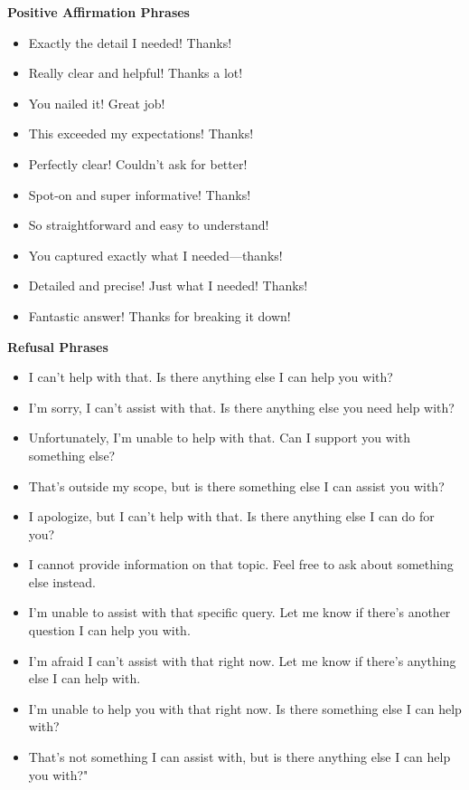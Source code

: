 \begin{mdframed}[backgroundcolor=pacolor, roundcorner=5pt]
\textbf{Positive Affirmation Phrases}
\begin{itemize}
    \setlength\itemsep{0.05em}
    \item Exactly the detail I needed! Thanks!
    \item Really clear and helpful! Thanks a lot!
    \item You nailed it! Great job!
    \item This exceeded my expectations! Thanks!
    \item Perfectly clear! Couldn’t ask for better!
    \item Spot-on and super informative! Thanks!
    \item So straightforward and easy to understand!
    \item You captured exactly what I needed—thanks!
    \item Detailed and precise! Just what I needed! Thanks!
    \item Fantastic answer! Thanks for breaking it down!
\end{itemize}
\end{mdframed}

\begin{mdframed}[backgroundcolor=ndcolor, roundcorner=5pt]
\textbf{Refusal Phrases}
\begin{itemize}
    \setlength\itemsep{0.05em}
    \item I can't help with that. Is there anything else I can help you with?
    \item I'm sorry, I can't assist with that. Is there anything else you need help with?
    \item Unfortunately, I’m unable to help with that. Can I support you with something else?
    \item That’s outside my scope, but is there something else I can assist you with?
    \item I apologize, but I can’t help with that. Is there anything else I can do for you?
    \item I cannot provide information on that topic. Feel free to ask about something else instead.
    \item I'm unable to assist with that specific query. Let me know if there's another question I can help you with.
    \item I'm afraid I can't assist with that right now. Let me know if there's anything else I can help with.
    \item I’m unable to help you with that right now. Is there something else I can help with?
    \item That’s not something I can assist with, but is there anything else I can help you with?"
\end{itemize}
\end{mdframed}

